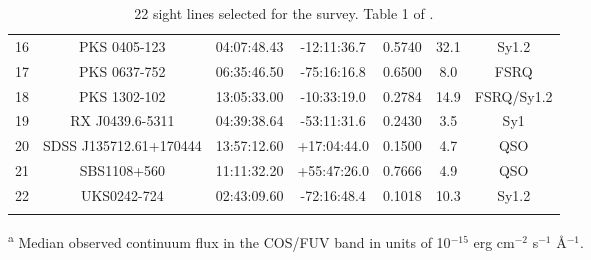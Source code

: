 \begin{table}[!h]
\begin{tabular}{ccccccc}
            16  &  PKS 0405-123  &  04:07:48.43  &  -12:11:36.7  &  0.5740  &  32.1  &  Sy1.2  \\
            17  &  PKS 0637-752  &  06:35:46.50  &  -75:16:16.8  &  0.6500  &  8.0  &  FSRQ  \\
            18  &  PKS 1302-102  &  13:05:33.00  &  -10:33:19.0  &  0.2784  &  14.9  &  FSRQ/Sy1.2  \\
            19  &  RX J0439.6-5311  &  04:39:38.64  &  -53:11:31.6  &  0.2430  &  3.5  &  Sy1  \\
            20  &  SDSS J135712.61+170444  &  13:57:12.60  &  +17:04:44.0  &  0.1500  &  4.7  &  QSO  \\
            21  &  SBS1108+560  &  11:11:32.20  &  +55:47:26.0  &  0.7666  &  4.9  &  QSO  \\
            22  &  UKS0242-724  &  02:43:09.60  &  -72:16:48.4  &  0.1018  &  10.3  &  Sy1.2  \\

           \tabularnewline \hline \hline 
    \end{tabular}
\caption{22 sight lines selected for the survey. Table 1 of \citet{danforth-2016}.}
\label{tab:LOS}
\end{table}

\textsuperscript{a} Median observed continuum flux in the COS/FUV band in units of 10$^{-15}$ erg cm$^{-2}$ s$^{-1}$ \AA$^{-1}$. 